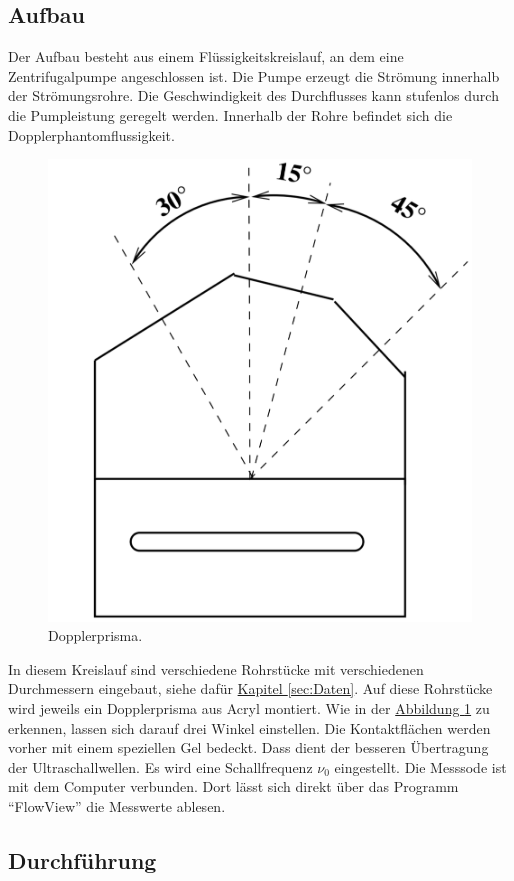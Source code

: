 \subsection{Aufbau}
Der Aufbau besteht aus einem Flüssigkeitskreislauf, an dem eine Zentrifugalpumpe angeschlossen ist.
Die Pumpe erzeugt die Strömung innerhalb der Strömungsrohre. Die Geschwindigkeit des Durchflusses kann stufenlos
durch die Pumpleistung geregelt werden. Innerhalb der Rohre befindet sich die Dopplerphantomflussigkeit.
\begin{figure}
    \center
    \includegraphics[width=\linewidth]{pictures/Skizze2.pdf}
    \caption{Dopplerprisma.}
    \label{fig:Skizze2}
\end{figure}
In diesem Kreislauf sind verschiedene Rohrstücke mit verschiedenen Durchmessern eingebaut, siehe dafür \hyperref[sec:Daten]{Kapitel \ref{sec:Daten}}.
Auf diese Rohrstücke wird jeweils ein Dopplerprisma aus Acryl montiert.
Wie in der \hyperref[fig:Skizze2]{Abbildung \ref{fig:Skizze2}} zu erkennen, lassen sich darauf drei Winkel einstellen.
Die Kontaktflächen werden vorher mit einem speziellen Gel bedeckt.
Dass dient der besseren Übertragung der Ultraschallwellen.
Es wird eine Schallfrequenz $\nu_0$ eingestellt.
Die Messsode ist mit dem Computer verbunden. Dort lässt sich direkt über das Programm \enquote{FlowView} die Messwerte ablesen.
\subsection{Durchführung}
